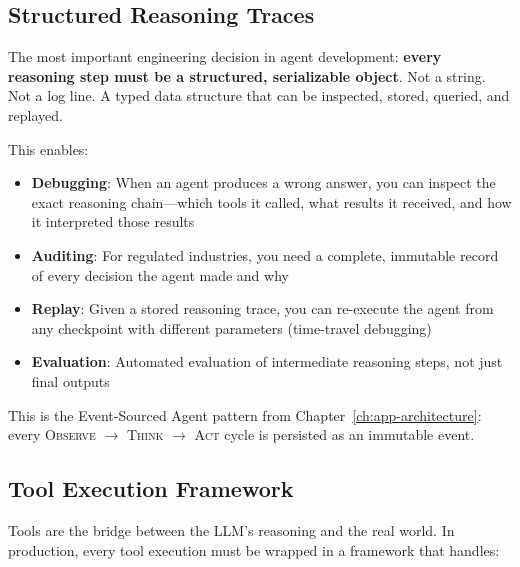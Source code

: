\subsection{Structured Reasoning Traces}

The most important engineering decision in agent development: \textbf{every reasoning step must be a structured, serializable object}. Not a string. Not a log line. A typed data structure that can be inspected, stored, queried, and replayed.

This enables:

\begin{itemize}[leftmargin=*]
    \item \textbf{Debugging}: When an agent produces a wrong answer, you can inspect the exact reasoning chain---which tools it called, what results it received, and how it interpreted those results
    \item \textbf{Auditing}: For regulated industries, you need a complete, immutable record of every decision the agent made and why
    \item \textbf{Replay}: Given a stored reasoning trace, you can re-execute the agent from any checkpoint with different parameters (time-travel debugging)
    \item \textbf{Evaluation}: Automated evaluation of intermediate reasoning steps, not just final outputs
\end{itemize}

This is the Event-Sourced Agent pattern from Chapter~\ref{ch:app-architecture}: every \textsc{Observe} $\to$ \textsc{Think} $\to$ \textsc{Act} cycle is persisted as an immutable event.


\subsection{Tool Execution Framework}

Tools are the bridge between the LLM's reasoning and the real world. In production, every tool execution must be wrapped in a framework that handles:

